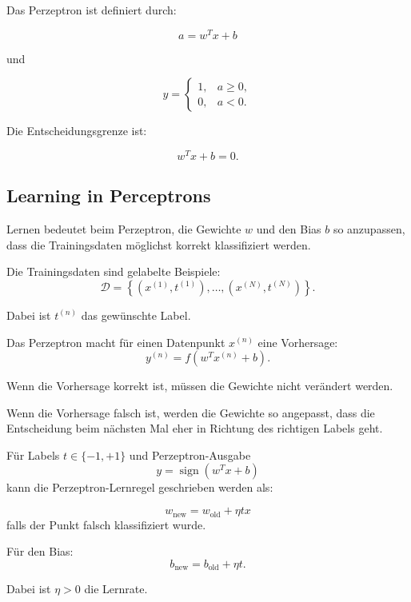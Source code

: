 \documentclass[11pt,a4paper]{scrartcl}
\newcommand{\set}[1]{\left\{ #1 \right\}}
\begin{document}
\begin{answerbox}
    Das Perzeptron ist definiert durch:

    \[
        \boxed{
            a = w^T x + b
        }
    \]

    und

    \[
        \boxed{
            y =
            \begin{cases}
                1, & a \geq 0,\\
                0, & a < 0.
            \end{cases}
        }
    \]

    Die Entscheidungsgrenze ist:

    \[
        \boxed{
            w^T x + b = 0.
        }
    \]
\end{answerbox}

\subsection{Learning in Perceptrons}

\begin{notebox}
    Lernen bedeutet beim Perzeptron, die Gewichte \(w\) und den Bias \(b\)
    so anzupassen, dass die Trainingsdaten möglichst korrekt klassifiziert
    werden.

    Die Trainingsdaten sind gelabelte Beispiele:
    \[
        \mathcal{D}
        =
        \set{(x^{(1)},t^{(1)}),\dots,(x^{(N)},t^{(N)})}.
    \]

    Dabei ist \(t^{(n)}\) das gewünschte Label.
\end{notebox}

\begin{solutionbox}
    Das Perzeptron macht für einen Datenpunkt \(x^{(n)}\) eine Vorhersage:
    \[
        y^{(n)}
        =
        f(w^T x^{(n)} + b).
    \]

    Wenn die Vorhersage korrekt ist, müssen die Gewichte nicht verändert werden.

    Wenn die Vorhersage falsch ist, werden die Gewichte so angepasst, dass die
    Entscheidung beim nächsten Mal eher in Richtung des richtigen Labels geht.
\end{solutionbox}

\begin{calculationbox}
    Für Labels \(t \in \{-1,+1\}\) und Perzeptron-Ausgabe
    \[
        y = \operatorname{sign}(w^T x + b)
    \]
    kann die Perzeptron-Lernregel geschrieben werden als:

    \[
        w_{\text{new}}
        =
        w_{\text{old}}
        +
        \eta t x
    \]
    falls der Punkt falsch klassifiziert wurde.

    Für den Bias:
    \[
        b_{\text{new}}
        =
        b_{\text{old}}
        +
        \eta t.
    \]

    Dabei ist \(\eta>0\) die Lernrate.
\end{calculationbox}
\end{document}
